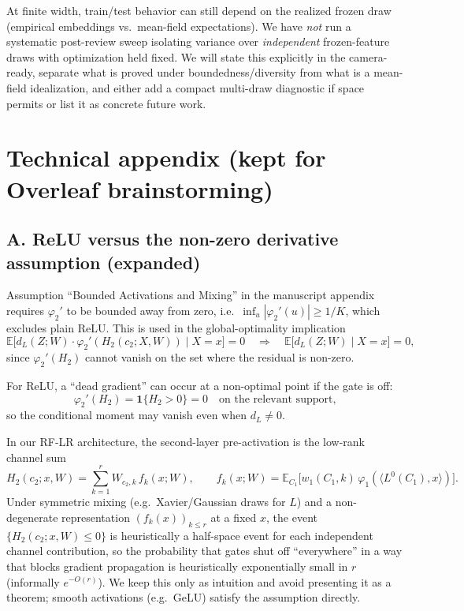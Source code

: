 \documentclass[11pt,a4paper]{article}
\begin{document}
At finite width, train/test behavior can still depend on the realized frozen draw (empirical embeddings vs.\ mean-field expectations). We have \emph{not} run a systematic post-review sweep isolating variance over \emph{independent} frozen-feature draws with optimization held fixed. We will state this explicitly in the camera-ready, separate what is proved under boundedness/diversity from what is a mean-field idealization, and either add a compact multi-draw diagnostic if space permits or list it as concrete future work.


\section*{Technical appendix (kept for Overleaf brainstorming)}

\subsection*{A. ReLU versus the non-zero derivative assumption (expanded)}

Assumption ``Bounded Activations and Mixing'' in the manuscript appendix requires $\varphi_2'$ to be bounded away from zero, i.e.\ $\inf_u|\varphi_2'(u)|\ge 1/K$, which excludes plain ReLU. This is used in the global-optimality implication
\[
\mathbb{E}\big[d_L(Z;W)\cdot \varphi_2'(H_2(c_2;X,W))\mid X=x\big]=0
\quad\Longrightarrow\quad
\mathbb{E}\big[d_L(Z;W)\mid X=x\big]=0,
\]
since $\varphi_2'(H_2)$ cannot vanish on the set where the residual is non-zero.

For ReLU, a ``dead gradient'' can occur at a non-optimal point if the gate is off:
\[
\varphi_2'(H_2)=\mathbf{1}\{H_2>0\}=0 \quad\text{on the relevant support,}
\]
so the conditional moment may vanish even when $d_L\neq 0$.

In our RF-LR architecture, the second-layer pre-activation is the low-rank channel sum
\[
H_2(c_2;x,W)=\sum_{k=1}^r W_{c_2,k}\,f_k(x;W),
\qquad
f_k(x;W)=\mathbb{E}_{C_1}\!\big[w_1(C_1,k)\,\varphi_1(\langle L^0(C_1),x\rangle)\big].
\]
Under symmetric mixing (e.g.\ Xavier/Gaussian draws for $L$) and a non-degenerate representation $(f_k(x))_{k\le r}$ at a fixed $x$, the event $\{H_2(c_2;x,W)\le 0\}$ is heuristically a half-space event for each independent channel contribution, so the probability that gates shut off ``everywhere'' in a way that blocks gradient propagation is heuristically exponentially small in $r$ (informally $e^{-O(r)}$). We keep this only as intuition and avoid presenting it as a theorem; smooth activations (e.g.\ GeLU) satisfy the assumption directly.
\end{document}
